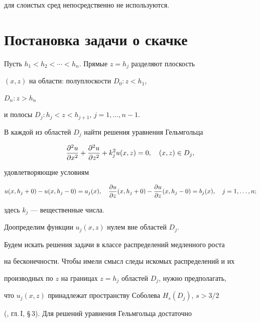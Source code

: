 для слоистых сред непосредственно не используются.








\section{Постановка задачи о скачке}





Пусть $h_1<h_2<\dotsb <h_n$. Прямые $z=h_j$ разделяют плоскость


$(x,z)$ на области: полуплоскости $D_0:z<h_1$,


$D_n:z>h_n$


и полосы $D_j: h_j<z<h_{j+1}$, $j=1,\dotsc,n-1$.


В каждой из областей $D_j$ найти решения уравнения Гельмгольца


\begin{equation}


\frac{\pa^2u}{\pa x^2}+\frac{\pa^2u}{\pa z^2}+k_j^2 u(x,z) = 0,


\quad (x,z)\in D_j,


\end{equation}


удовлетворяющие условиям


\begin{equation}


u(x,h_j+0)-u(x,h_j-0) = a_j(x),\quad


\frac{\pa u}{\pa z}(x,h_j+0)-\frac{\pa u}{\pa z}(x,h_j-0) = b_j(x),


\quad j=1,\dotsc,n;


\end{equation}


здесь $k_j$ --- вещественные числа.





Доопределим функции $u_j(x,z)$ нулем вне областей $D_j$.


Будем искать решения задачи в классе распределений медленного роста


на бесконечности. Чтобы имели смысл следы искомых распределений и их


производных по $z$ на границах $z=h_j$ областей $D_j$, нужно предполагать,


что $u_j(x,z)$ принадлежат пространству Соболева $H_s(D_j)$, $s>3/2$


(\cite{Egr.GT}, гл.\,I, \S\,3). Для решений уравнения Гельмгольца достаточно


